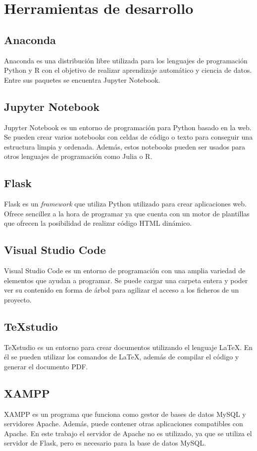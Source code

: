 \section{Herramientas de desarrollo}
\subsection{Anaconda}
Anaconda es una distribución libre utilizada para los lenguajes de programación Python y R con el objetivo de realizar aprendizaje automático y ciencia de datos. Entre sus paquetes se encuentra Jupyter Notebook.

\subsection{Jupyter Notebook}
Jupyter Notebook es un entorno de programación para Python basado en la web. Se pueden crear varios notebooks con celdas de código o texto para conseguir una estructura limpia y ordenada. Además, estos notebooks pueden ser usados para otros lenguajes de programación como Julia o R.

\subsection{Flask}
Flask es un \textit{framework} que utiliza Python utilizado para crear aplicaciones web. Ofrece sencillez a la hora de programar ya que cuenta con un motor de plantillas que ofrecen la posibilidad de realizar código HTML dinámico.

\subsection{Visual Studio Code}
Visual Studio Code es un entorno de programación con una amplia variedad de elementos que ayudan a programar. Se puede cargar una carpeta entera y poder ver su contenido en forma de árbol para agilizar el acceso a los ficheros de un proyecto.

\subsection{TeXstudio}
TeXstudio es un entorno para crear documentos utilizando el lenguaje \LaTeX{}. En él se pueden utilizar los comandos de \LaTeX{}, además de compilar el código y generar el documento PDF.

\subsection{XAMPP}
XAMPP es un programa que funciona como gestor de bases de datos MySQL y servidores Apache. Además, puede contener otras aplicaciones compatibles con Apache. En este trabajo el servidor de Apache no es utilizado, ya que se utiliza el servidor de Flask, pero es necesario para la base de datos MySQL.

